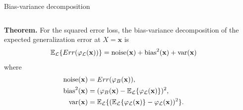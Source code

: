 \documentclass{beamer}
\begin{document}
\begin{frame}{Bias-variance decomposition}

\begin{columns}
\begin{column}{0.65\textwidth}

{\bf Theorem.} For the squared error loss, the bias-variance decomposition of the expected
generalization error at $X=\mathbf{x}$ is
\begin{equation*}
\mathbb{E}_{\cal L} \{ Err(\varphi_{\cal L}(\mathbf{x})) \} = \text{noise}(\mathbf{x}) + \text{bias}^2(\mathbf{x}) + \text{var}(\mathbf{x})
\end{equation*}
where
\begin{align*}
\text{noise}(\mathbf{x}) &= Err(\varphi_B(\mathbf{x})), \\
\text{bias}^2(\mathbf{x}) &= (\varphi_B(\mathbf{x}) - \mathbb{E}_{\cal L} \{ \varphi_{\cal L}(\mathbf{x}) \} )^2, \\
\text{var}(\mathbf{x}) &= \mathbb{E}_{\cal L} \{ (\mathbb{E}_{\cal L} \{ \varphi_{\cal L}(\mathbf{x}) \} - \varphi_{\cal L}(\mathbf{x}))^2 \}.
\end{align*}

\end{column}
\begin{column}{0.35\textwidth}


\end{column}
\end{columns}
\end{frame}
\end{document}
